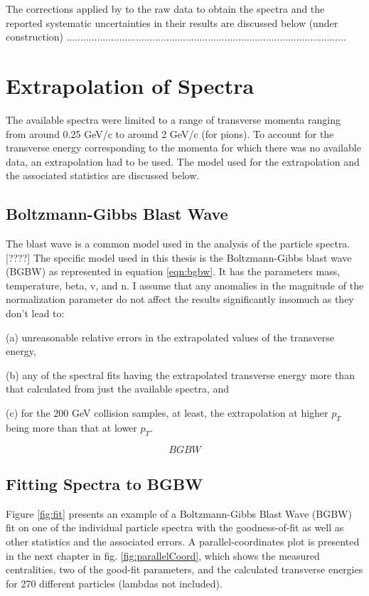 The corrections applied by \citet{PhysRevC.96.044904} to the raw data to obtain the spectra and the reported systematic uncertainties in their results are discussed below (under construction)
.....................................................................................................

\section{Extrapolation of Spectra}
The available spectra were limited to a range of transverse momenta ranging from around 0.25 GeV/c to around 2 GeV/c (for pions). To account for the transverse energy corresponding to the momenta for which there was no available data, an extrapolation had to be used. The model used for the extrapolation and the associated statistics are discussed below.

\subsection{Boltzmann-Gibbs Blast Wave}
The blast wave is a common model used in the analysis of the particle spectra.[????] The specific model used in this thesis is the Boltzmann-Gibbs blast wave (BGBW) as represented in equation \ref{eqn:bgbw}. It has the parameters mass, temperature, beta, v, and n. I assume that any anomalies in the magnitude of the normalization parameter do not affect the results significantly insomuch as they don't lead to: 

(a) unreasonable relative errors in the extrapolated values of the transverse energy,

(b) any of the spectral fits having the extrapolated transverse energy more than that calculated from just the available spectra, and

(c) for the 200 GeV collision samples, at least, the extrapolation at higher $p_{T}$ being more than that at lower $p_{T}$.

	\begin{equation}\label{eqn:BGBW}
	BGBW
	\end{equation}

\subsection{Fitting Spectra to BGBW}
Figure \ref{fig:fit} presents an example of a Boltzmann-Gibbs Blast Wave (BGBW) fit on one of the individual particle spectra with the goodness-of-fit as well as other statistics and the associated errors. A parallel-coordinates plot is presented in the next chapter in fig. \ref{fig:parallelCoord}, which shows the measured centralities, two of the good-fit parameters, and the calculated transverse energies for 270 different particles (lambdas not included).

